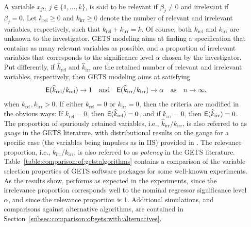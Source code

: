 \documentclass[article,nojss]{jss}
\begin{document}
A variable $x_{jt}$, $j\in \{1,\ldots,k\}$, is said to be relevant if $\beta_j \neq 0$ and irrelevant if $\beta_j = 0$. Let $k_{\text{rel}} \geq 0$ and $k_{\text{irr}} \geq 0$ denote the number of relevant and irrelevant variables, respectively, such that $k_{\text{rel}} + k_{\text{irr}} = k$. Of course, both $k_{\text{rel}}$ and $k_{\text{irr}}$ are unknown to the investigator. GETS modeling aims at finding a specification that contains as many relevant variables as possible, and a proportion of irrelevant variables that corresponds to the significance level $\alpha$ chosen by the investigator. Put differently, if $\widehat{k}_{\text{rel}}$ and $\widehat{k}_{\text{irr}}$ are the retained number of relevant and irrelevant variables, respectively, then GETS modeling aims at satisfying 
%
\begin{equation}
\mathsf{E}(\widehat{k}_{\text{rel}}/k_{\text{rel}}) \rightarrow 1 \quad \textnormal{and} \quad \mathsf{E}(\widehat{k}_{\text{irr}}/k_{\text{irr}}) \rightarrow \alpha \quad \textnormal{as} \quad n\rightarrow\infty,
\end{equation}
%
when $k_{\text{rel}},k_{\text{irr}}>0$.  If either $k_{\text{rel}}=0$
or $k_{\text{irr}}=0$, then the criteria are modified in the obvious
ways: If $k_{\text{rel}}=0$, then $\mathsf{E}(\widehat{k}_{\text{rel}}) = 0$,
and if $k_{\text{irr}}=0$, then $\mathsf{E}(\widehat{k}_{\text{irr}}) =
0$. The proportion of spuriously retained variables, i.e.,
$\widehat{k}_{\text{irr}}/k_{\text{irr}}$, is also referred to as
\textit{gauge} in the GETS literature, with distributional results on
the gauge for a specific case (the variables being impulses as in IIS)
provided in \cite{johansen2016asymptotic}. The relevance proportion,
i.e., $\widehat{k}_{\text{irr}}/k_{\text{irr}}$, is also referred to
as \textit{potency} in the GETS
literature. Table~\ref{table:comparison:of:gets:algorithms} contains a
comparison of the variable selection properties of GETS software
packages for some well-known experiments. As the results show,
 performs as expected in the experiments, since the
irrelevance proportion corresponds well to the nominal regressor
significance level $\alpha$, and since the relevance proportion is
1. Additional simulations, and comparisons against alternative
algorithms, are contained in
Section~\ref{subsec:comparison:of:gets:with:alternatives}.
\end{document}
